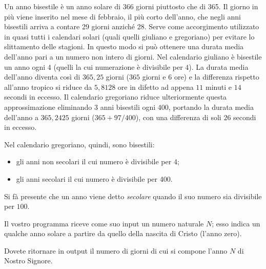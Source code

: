 \renewcommand{\nomebreve}{bisestile\_gregoriano}
\renewcommand{\titolo}{Esercizio uso if: Riconscimento di anni bisestili}

\introduzione{}

Un anno bisestile è un anno solare di 366 giorni piuttosto che di 365.
Il giorno in più viene inserito nel mese di febbraio, il più corto dell'anno, che negli anni bisestili arriva a contare 29 giorni anziché 28.
Serve come accorgimento utilizzato in quasi tutti i calendari solari (quali quelli giuliano e gregoriano) per evitare lo slittamento delle stagioni.
In questo modo si può ottenere una durata media dell'anno pari a un numero non intero di giorni. 
Nel calendario giuliano è bisestile un anno ogni 4 (quelli la cui numerazione è divisibile per $4$). La durata media dell'anno diventa così di $365,25$ giorni ($365$ giorni e $6$ ore) e la differenza rispetto all'anno tropico si riduce da $5,8128$ ore in difetto ad appena $11$ minuti e $14$ secondi in eccesso. Il calendario gregoriano riduce ulteriormente questa approssimazione eliminando $3$ anni bisestili ogni $400$, portando la durata media dell'anno a $365,2425$ giorni ($365 + 97/400$), con una differenza di soli $26$ secondi in eccesso.

Nel calendario gregoriano, quindi, sono bisestili:
\begin{itemize}
   \item gli anni non secolari il cui numero è divisibile per 4;
   \item gli anni secolari il cui numero è divisibile per 400.
\end{itemize}

Si fà presente che un anno viene detto \emph{secolare} quando il suo numero sia divisibile per $100$.

Il vostro programma riceve come suo input un numero naturale $N$; esso indica un qualche anno solare a partire da quello della nascita di Cristo (l'anno zero).


Dovete ritornare in output il numero di giorni di cui si compone l'anno $N$ di Nostro Signore.







